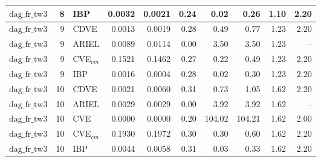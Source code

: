 \begin{table}[ht]
\begin{tabular}{lrlrrrrrrr}
$\text{dag\_fr\_tw3}$ & 8 & IBP & 0.0032 & 0.0021 & 0.24 & 0.02 & 0.26 & 1.10 & 2.20 \\
\hline
$\text{dag\_fr\_tw3}$ & 9 & CDVE & 0.0013 & 0.0019 & 0.28 & 0.49 & 0.77 & 1.23 & 2.20 \\
$\text{dag\_fr\_tw3}$ & 9 & ARIEL & 0.0089 & 0.0114 & 0.00 & 3.50 & 3.50 & 1.23 & -- \\
$\text{dag\_fr\_tw3}$ & 9 & CVE$_{cm}$ & 0.1521 & 0.1462 & 0.27 & 0.22 & 0.49 & 1.23 & 2.20 \\
$\text{dag\_fr\_tw3}$ & 9 & IBP & 0.0016 & 0.0004 & 0.28 & 0.02 & 0.30 & 1.23 & 2.20 \\
\hline
$\text{dag\_fr\_tw3}$ & 10 & CDVE & 0.0021 & 0.0060 & 0.31 & 0.73 & 1.05 & 1.62 & 2.20 \\
$\text{dag\_fr\_tw3}$ & 10 & ARIEL & 0.0029 & 0.0029 & 0.00 & 3.92 & 3.92 & 1.62 & -- \\
$\text{dag\_fr\_tw3}$ & 10 & CVE & 0.0000 & 0.0000 & 0.20 & 104.02 & 104.21 & 1.62 & 2.00 \\
$\text{dag\_fr\_tw3}$ & 10 & CVE$_{cm}$ & 0.1930 & 0.1972 & 0.30 & 0.30 & 0.60 & 1.62 & 2.20 \\
$\text{dag\_fr\_tw3}$ & 10 & IBP & 0.0044 & 0.0058 & 0.31 & 0.03 & 0.33 & 1.62 & 2.20 \\
\bottomrule
\end{tabular}
\end{table}

